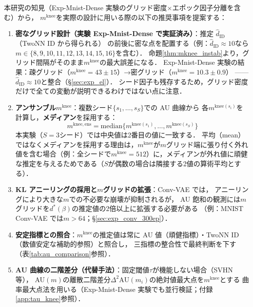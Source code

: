 \documentclass[11pt,a4paper]{jsarticle}
\newcommand{\mknee}{m^{\mathrm{knee}}}
\begin{document}
本研究の知見（Exp-Mnist-Dense 実験のグリッド密度×エポック因子分離を含む）から，
$\mknee$を実際の設計に用いる際の以下の推奨事項を提案する：
\begin{enumerate}
  \item \textbf{密なグリッド設計（実験 Exp-Mnist-Dense で実証済み）}：推定 $\hat{d}_\mathrm{ID}$（TwoNN ID から得られる）
        の前後に密な点を配置する（例：$\hat{d}_\mathrm{ID} \approx 10$なら$m \in \{8,9,10,11,12,13,14,15,16\}$を含む）．
        命題\ref{thm:mknee_instab}より，グリッド間隔がそのまま$\mknee$の最大誤差になる．
        Exp-Mnist-Dense 実験の結果：疎グリッド（$\mknee=43\pm15$）→密グリッド（$\mknee=10.3\pm0.9$）
        —— $\hat{d}_\mathrm{ID} \approx 10$と整合（§\ref{sec:exp_el}）．
        シード因子も残存するため，グリッド密度だけで全ての変動が説明できるわけではない点に注意．
  \item \textbf{アンサンブル$\mknee$}：複数シード$\{s_1,\ldots,s_S\}$での AU 曲線から
        各$m^{\mathrm{knee}(s_i)}$を計算し，\textbf{メディアン}を採用する：
        \begin{equation}
          m^{\mathrm{knee,ens}} = \mathrm{median}\bigl\{m^{\mathrm{knee}(s_1)}, \ldots, m^{\mathrm{knee}(s_S)}\bigr\}
          \label{eq:mknee_ens}
        \end{equation}
        本実験（$S=3$シード）では中央値は2番目の値に一致する．
        平均（mean）ではなくメディアンを採用する理由は，$\mknee$が$m$グリッド端に張り付く外れ値を含む場合（例：全シードで$\mknee=512$）に，メディアンが外れ値に頑健な推定を与えるためである（$S$が偶数の場合は隣接する2値の算術平均とする）．
  \item \textbf{KL アニーリングの採用と$m$グリッドの拡張}：Conv-VAE では，
        アニーリングにより大きな$m$での不必要な崩壊が抑制されるが，
        AU 飽和の観測には$m$グリッドを$d^*(\beta)$の推定値の2倍以上に拡張する必要がある
        （例：MNIST Conv-VAE では$m > 64$；§\ref{sec:exp_conv_300ep}）．
  \item \textbf{安定指標との照合}：$\mknee$の推定値は常に AU 値（頑健指標）・TwoNN ID（数値安定な補助的参照）と照合し，
        三指標の整合性で最終判断を下す（表\ref{tab:au_comparison}参照）．
  \item \textbf{AU 曲線の二階差分（代替手法）}：固定閾値$\tau$が機能しない場合（SVHN 等），
        AU$(m)$の離散二階差分$\Delta^2\mathrm{AU}(m_i)$の絶対値最大点を$\mknee$とする
        曲率最大点法を用いる（Exp-Mnist-Dense 実験でも並行検証；付録\ref{app:tau_knee}参照）．
\end{enumerate}
\end{document}
